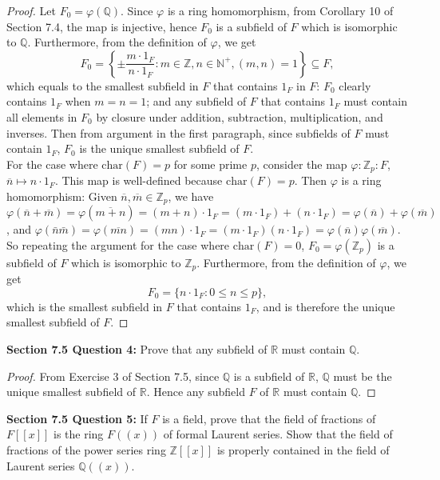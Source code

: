 \documentclass{article}
\begin{document}
\begin{proof}
    Let $F_0=\varphi(\mathbb{Q})$. Since $\varphi$ is a ring homomorphism,
    from Corollary 10 of Section 7.4, the map is injective, hence
    $F_0$ is a subfield of $F$ which is isomorphic to $\mathbb{Q}$.
    Furthermore, from the definition of $\varphi$, we get
    \[F_0=\left\{\pm\frac{m\cdot 1_F}{n\cdot 1_F}:
    m\in\mathbb{Z},n\in\mathbb{N}^+,(m,n)=1\right\} \subseteq F,\] which
    equals to the smallest subfield in $F$ that contains $1_F$ in $F$:
    $F_0$ clearly contains $1_F$ when $m=n=1$; and any subfield of $F$ that
    contains $1_F$ must contain all elements in $F_0$ by closure under
    addition, subtraction, multiplication, and inverses. Then from argument
    in the first paragraph, since subfields of $F$ must contain $1_F$,
    $F_0$ is the unique smallest subfield of $F$. \\

    For the case where $\text{char}(F)=p$ for some prime $p$, consider the
    map $\varphi:\mathbb{Z}_p:F$, $\overline{n}\mapsto n\cdot1_F$. This map
    is well-defined because $\text{char}(F)=p$. Then
    $\varphi$ is a ring homomorphism: Given
    $\overline{n},\overline{m}\in\mathbb{Z}_p$, we have
    $\varphi(\overline{n}+\overline{m})= \varphi(\overline{m+n})
    =(m+n)\cdot1_F =(m\cdot1_F)+(n\cdot1_F)
    =\varphi(\overline{n})+\varphi(\overline{m})$, and
    $\varphi(\bar{n}\bar{m})= \varphi(\overline{mn})
    =(mn)\cdot1_F =(m\cdot1_F)(n\cdot1_F)
    =\varphi(\overline{n})\varphi(\overline{m})$. So repeating the argument
    for the case where $\text{char}(F)=0$, $F_0=\varphi(\mathbb{Z}_p)$ is a
    subfield of $F$ which is isomorphic to $\mathbb{Z}_p$. Furthermore,
    from the definition of $\varphi$, we get
    \[F_0=\{n\cdot1_F:0\leq n\leq p\},\] which is the smallest subfield in
    $F$ that contains $1_F$, and is therefore the unique smallest subfield
    of $F$.
  \end{proof}

\textbf{Section 7.5 Question 4:} Prove that any subfield of $\mathbb{R}$
  must contain $\mathbb{Q}$.
  \begin{proof}
    From Exercise 3 of Section 7.5, since $\mathbb{Q}$ is a subfield of
    $\mathbb{R}$, $\mathbb{Q}$ must be the unique smallest subfield of
    $\mathbb{R}$. Hence any subfield $F$ of $\mathbb{R}$ must contain
    $\mathbb{Q}$.
  \end{proof}

\textbf{Section 7.5 Question 5:} If $F$ is a field, prove that the field of
  fractions of $F[[x]]$ is the ring $F((x))$ of formal Laurent series. Show
  that the field of fractions of the power series ring $\mathbb{Z}[[x]]$ is
  properly contained in the field of Laurent series $\mathbb{Q}((x))$.
\end{document}
